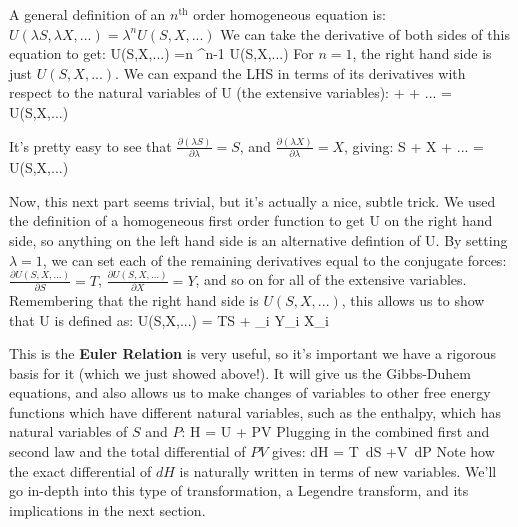 \documentclass[12pt]{article}
\begin{document}
A general definition of an $n^\text{th}$ order homogeneous equation is:
$U(\lambda S, \lambda X,...)=\lambda^n U(S,X,...)$
We can take the derivative of both sides of this equation to get:
\eqs
\frac{\partial}{\partial \lambda} U(\lambda S,\lambda X,...) =n \lambda^{n-1} U(S,X,...)
\eqe
For $n = 1$, the right hand side is just $U(S,X,...)$. We can expand the LHS in terms of its derivatives with respect to the natural variables of U (the extensive variables):
\eqs
{}  +   + ... = U(S,X,...)
\eqe

It's pretty easy to see that $\frac{\partial (\lambda S)}{\partial \lambda} = S$, and $\frac{\partial (\lambda X)}{\partial \lambda} = X$, giving:
\eqs
S  + X  + ... = U(S,X,...)
\eqe

Now, this next part seems trivial, but it's actually a nice, subtle trick. We used the definition of a homogeneous first order function to get U on the right hand side, so anything on the left hand side is an alternative defintion of U. By setting $\lambda = 1$, we can set each of the remaining derivatives equal to the conjugate forces:
$\frac{\partial U(S, X,...)}{\partial S} = T$, $\frac{\partial U(S, X,...)}{\partial X} = Y$, and so on for all of the extensive variables.
Remembering that the right hand side is $U(S,X,...)$, this allows us to show that U is defined as:
\eqs
U(S,X,...) = TS + \sum_i Y_i X_i \label{Euler}
\eqe

This is the \textbf{Euler Relation} is very useful, so it's important we have a rigorous basis for it (which we just showed above!). It will give us the Gibbs-Duhem equations, and also allows us to make changes of variables to other free energy functions which have different natural variables, such as the enthalpy, which has natural variables of $S$ and $P$:
\eqs H = U + PV \eqe
Plugging in the combined first and second law and the total differential of $PV$ gives:
\eqs dH = T\, dS +V\, dP \eqe
Note how the exact differential of $dH$ is naturally written in terms of new variables. We'll go in-depth into this type of transformation, a Legendre transform, and its implications in the next section.


\end{document}
